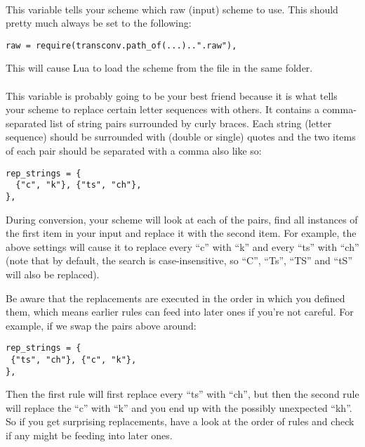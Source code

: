 \documentclass{ltxdockit}
\begin{document}
\paragraph{}

This variable tells your scheme which raw (input) scheme to use. This should
pretty much always be set to the following:

\begin{lstlisting}
raw = require(transconv.path_of(...)..".raw"),
\end{lstlisting}

This will cause Lua to load the scheme from the  file in the same
folder.

\paragraph{}

This variable is probably going to be your best friend because it is what tells
your scheme to replace certain letter sequences with others. It contains a
comma-separated list of string pairs surrounded by curly braces. Each string
(letter sequence) should be surrounded with (double or single) quotes and the
two items of each pair should be separated with a comma also like so:

\begin{lstlisting}
rep_strings = {
  {"c", "k"}, {"ts", "ch"},
},
\end{lstlisting}

During conversion, your scheme will look at each of the pairs, find all
instances of the first item in your input and replace it with the second item.
For example, the above settings will cause it to replace every \enquote{c} with
\enquote{k} and every \enquote{ts} with \enquote{ch} (note that by
default, the search is case-insensitive, so \enquote{C}, \enquote{Ts},
\enquote{TS} and \enquote{tS} will also be replaced).

Be aware that the replacements are executed in the order in which you defined
them, which means earlier rules can feed into later ones if you're not careful.
For example, if we swap the pairs above around:

\begin{lstlisting}
rep_strings = {
 {"ts", "ch"}, {"c", "k"},
},
\end{lstlisting}

Then the first rule will first replace every \enquote{ts} with \enquote{ch}, but
then the second rule will replace the \enquote{c} with \enquote{k} and you end
up with the possibly unexpected \enquote{kh}. So if you get surprising
replacements, have a look at the order of rules and check if any might be
feeding into later ones.
\end{document}
